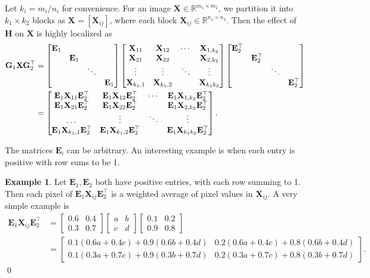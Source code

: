 \documentclass[10pt]{article}  	%
\theoremstyle{definition}
\theoremstyle{definition}
\newtheorem{example}[theorem]{Example}
\newcommand{\R}{{\mathbb{R}}}
\newcommand{\mE}{\mathbf{E}}
\newcommand{\mG}{\mathbf{G}}
\newcommand{\mH}{\mathbf{H}}
\newcommand{\mX}{\mathbf{X}}
\theoremstyle{remark}
\begin{document}
Let $k_i=m_i / n_i$ for convenience. For an image $\mX\in\R^{m_1\times m_2}$, we partition it into $k_1\times k_2$ blocks as $\mX=[\mX_{ij}]$, where each block $\mX_{ij}\in\R^{n_1\times n_2}$. Then the effect of $\mH$ on $\mX$ is highly localized as
\begin{align}\notag
\mG_1\mX\mG_2^\top&=
\begin{bmatrix}
\mE_1&&&\\
&\mE_1&&\\
&&\ddots&\\
&&&\mE_1
\end{bmatrix}
\begin{bmatrix}
\mX_{11}&\mX_{12}&\cdots&\mX_{1,k_2}\\
\mX_{21}&\mX_{22}&&\mX_{2,k_2}\\
\vdots&\vdots&\ddots&\vdots\\
\mX_{k_1,1}&\mX_{k_1,2}&&\mX_{k_1k_2}
\end{bmatrix}\begin{bmatrix}
\mE_2^\top&&&\\
&\mE_2^\top&&\\
&&\ddots&\\
&&&\mE_2^\top
\end{bmatrix}\\
&=\begin{bmatrix}
\mE_1\mX_{11}\mE_2^\top&\mE_1\mX_{12}\mE_2^\top&\cdots&\mE_1\mX_{1,k_2}\mE_2^\top\\
\mE_1\mX_{21}\mE_2^\top&\mE_1\mX_{22}\mE_2^\top&&\mE_1\mX_{2,k_2}\mE_2^\top\\
\dots&\vdots&\ddots&\vdots\\\label{equ:g1xg2t}
\mE_1\mX_{k_1,1}\mE_2^\top&\mE_1\mX_{k_1,2}\mE_2^\top&&\mE_1\mX_{k_1k_2}\mE_2^\top
\end{bmatrix}.
\end{align}

The matrices $\mE_i$ can be arbitrary. An interesting example is when each entry is positive with row sums to be 1. 

\begin{example} 
Let $\mE_1, \mE_2$ both have positive entries, with each row summing to 1. Then each pixel of $\mE_1\mX_{ij}\mE_2^\top$ is a weighted average of pixel values in $\mX_{ij}$. A very simple example is
\begin{align*}
\mE_1\mX_{ij}\mE_2^\top &=
\begin{bmatrix}0.6&0.4\\0.3&0.7\end{bmatrix}
\begin{bmatrix}a&b\\c&d\end{bmatrix}
\begin{bmatrix}0.1&0.2\\0.9&0.8\end{bmatrix} \\
&=
\begin{bmatrix}
0.1(0.6a+0.4c)+0.9(0.6b+0.4d) & 0.2(0.6a+0.4c)+0.8(0.6b+0.4d)\\
0.1(0.3a+0.7c)+0.9(0.3b+0.7d) & 0.2(0.3a+0.7c)+0.8(0.3b+0.7d)
\end{bmatrix}.
\end{align*}\qed
\end{example}
\end{document}
